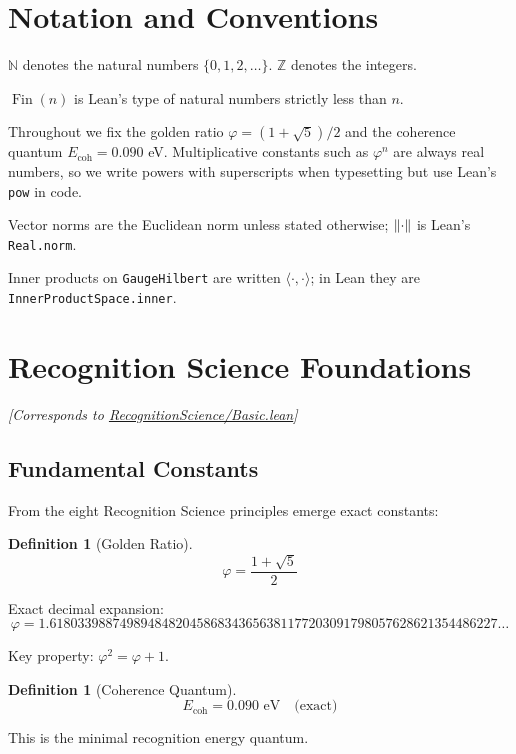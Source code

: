 \documentclass[11pt]{article}
\numberwithin{equation}{section}
\newtheorem{definition}[theorem]{Definition}
\theoremstyle{remark}
\newcommand{\Ecoh}{E_{\text{coh}}}
\newcommand{\N}{\mathbb{N}}
\newcommand{\Z}{\mathbb{Z}}
\DeclareMathOperator{\Fin}{Fin}
\begin{document}
\tableofcontents
\clearpage

\section{Notation and Conventions}

$\N$ denotes the natural numbers $\{0,1,2,\ldots\}$. $\Z$ denotes the integers.

$\Fin(n)$ is Lean's type of natural numbers strictly less than $n$.

Throughout we fix the golden ratio $\varphi = (1+\sqrt{5})/2$ and the coherence quantum $\Ecoh = 0.090$ eV.
Multiplicative constants such as $\varphi^n$ are always real numbers, so we write powers with
superscripts when typesetting but use Lean's \texttt{pow} in code.

Vector norms are the Euclidean norm unless stated otherwise; $\norm{\cdot}$ is Lean's \texttt{Real.norm}.

Inner products on \texttt{GaugeHilbert} are written $\langle\cdot,\cdot\rangle$; in Lean they are \texttt{InnerProductSpace.inner}.

\section{Recognition Science Foundations}
\textit{[Corresponds to \href{https://github.com/jonwashburn/Yang-Mills-Lean/blob/main/YangMillsProof/RecognitionScience/Basic.lean}{RecognitionScience/Basic.lean}]}

\subsection{Fundamental Constants}

From the eight Recognition Science principles emerge exact constants:

\begin{definition}[Golden Ratio]
\[\varphi = \frac{1 + \sqrt{5}}{2}\]
\end{definition}

Exact decimal expansion:
\[\varphi = 1.6180339887498948482045868343656381177203091798057628621354486227\ldots\]

Key property: $\varphi^2 = \varphi + 1$.

\begin{definition}[Coherence Quantum]
\[\Ecoh = 0.090 \text{ eV} \quad \text{(exact)}\]
\end{definition}

This is the minimal recognition energy quantum.
\end{document}
